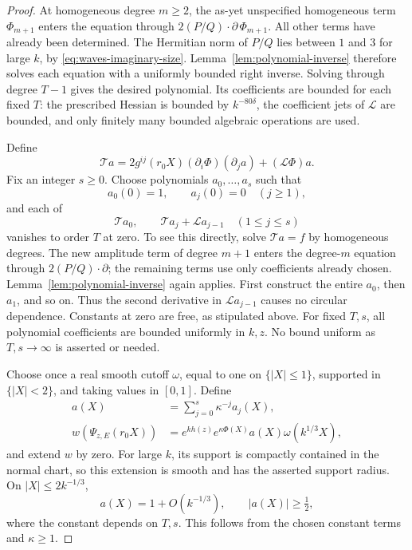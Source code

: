 \begin{proof}
At homogeneous degree \(m\ge2\), the as-yet unspecified homogeneous
term \(\Phi_{m+1}\) enters the equation through
\(2(P/Q)\cdot\partial\,\Phi_{m+1}\). All other terms have already
been determined. The Hermitian norm of \(P/Q\) lies between \(1\)
and \(3\) for large \(k\), by \eqref{eq:waves-imaginary-size}.
Lemma~\ref{lem:polynomial-inverse} therefore solves each equation
with a uniformly bounded right inverse. Solving through degree
\(T-1\) gives the desired polynomial. Its coefficients are bounded
for each fixed \(T\): the prescribed Hessian is bounded by
\(k^{-80\delta}\), the coefficient jets of \(\mathcal L\) are bounded,
and only finitely many bounded algebraic operations are used.

Define
\[
 \mathcal T a
 =2g^{ij}(r_0X)(\partial_i\Phi)(\partial_ja)
       +(\mathcal L\Phi)a.
\]
Fix an integer \(s\ge0\). Choose polynomials \(a_0,\ldots,a_s\) such
that
\[
 a_0(0)=1,\qquad a_j(0)=0\quad(j\ge1),
\]
and each of
\[
 \mathcal Ta_0,\qquad
 \mathcal Ta_j+\mathcal La_{j-1}\quad(1\le j\le s)
\]
vanishes to order \(T\) at zero. To see this directly, solve
\(\mathcal Ta=f\) by homogeneous degrees. The new amplitude term
of degree \(m+1\) enters the degree-\(m\) equation through
\(2(P/Q)\cdot\partial\); the remaining terms use only coefficients
already chosen. Lemma~\ref{lem:polynomial-inverse} again applies.
First construct the entire \(a_0\), then \(a_1\), and so on.
Thus the second derivative in \(\mathcal La_{j-1}\) causes no circular
dependence. Constants at zero are free, as stipulated above.
For fixed \(T,s\), all polynomial coefficients are bounded uniformly
in \(k,z\). No bound uniform as \(T,s\to\infty\) is asserted or needed.

Choose once a real smooth cutoff \(\omega\), equal to one on
\(\{|X|\le1\}\), supported in \(\{|X|<2\}\), and taking values in
\([0,1]\). Define
\begin{equation}\label{eq:packet-definition}
 \begin{split}
 a(X)&=\sum_{j=0}^s\kappa^{-j}a_j(X),\\
 w(\Psi_{z,E}(r_0X))
 &=e^{kh(z)}e^{\kappa\Phi(X)}a(X)\omega(k^{1/3}X),
 \end{split}
\end{equation}
and extend \(w\) by zero. For large \(k\), its support is compactly
contained in the normal chart, so this extension is smooth and has
the asserted support radius. On \(|X|\le2k^{-1/3}\),
\begin{equation}\label{eq:waves-amplitude}
 a(X)=1+O(k^{-1/3}),\qquad |a(X)|\ge\tfrac12,
\end{equation}
where the constant depends on \(T,s\). This follows from the chosen
constant terms and \(\kappa\ge1\).


\end{proof}
